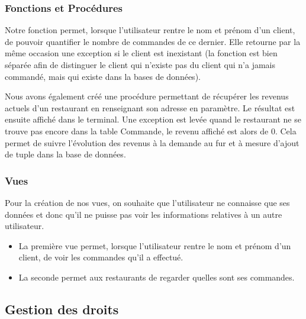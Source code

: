 \documentclass[french]{article}
\begin{document}
            \subsubsection*{Fonctions et Procédures}
            Notre fonction permet, lorsque l'utilisateur rentre le nom et prénom d'un client, de pouvoir quantifier le nombre de commandes de ce dernier.
            Elle retourne par la même occasion une exception si le client est inexistant (la fonction est bien séparée afin de distinguer le client qui n'existe pas du client qui n'a jamais commandé, mais qui existe dans la bases de données).\medskip

            Nous avons également créé une procédure permettant de récupérer les revenus actuels d'un restaurant en renseignant son adresse en paramètre. Le résultat est ensuite affiché dans le terminal. Une exception est levée quand le restaurant ne se trouve pas encore dans la table Commande, le revenu affiché est alors de 0. Cela permet de suivre l'évolution des revenus à la demande au fur et à mesure d'ajout de tuple dans la base de données.
            
            \subsubsection*{Vues}
            Pour la création de nos vues, on souhaite que l'utilisateur ne connaisse que ses données et donc qu'il ne puisse pas voir les informations relatives à un autre utilisateur.
            \begin{itemize}
                \item La première vue permet, lorsque l'utilisateur rentre le nom et prénom d'un client, de voir les commandes qu'il a effectué.
                \item La seconde permet aux restaurants de regarder quelles sont ses commandes.
            \end{itemize}

        \subsection*{Gestion des droits}
\end{document}
